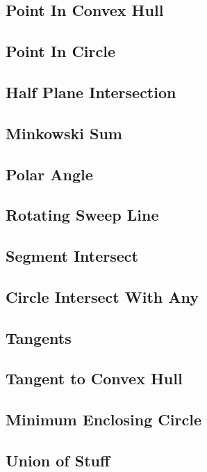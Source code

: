 \subsection{Point In Convex Hull}

\subsection{Point In Circle}

\subsection{Half Plane Intersection}

\subsection{Minkowski Sum}

\subsection{Polar Angle}

\subsection{Rotating Sweep Line}

\subsection{Segment Intersect}

\subsection{Circle Intersect With Any}

\subsection{Tangents}

\subsection{Tangent to Convex Hull}

\subsection{Minimum Enclosing Circle}

\subsection{Union of Stuff}


